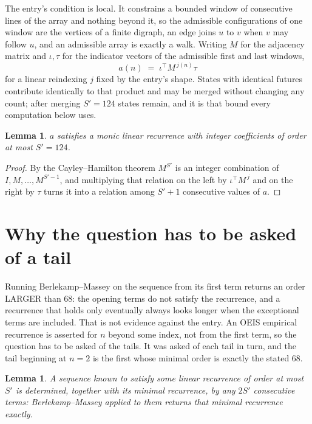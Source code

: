 \documentclass[11pt,a4paper]{article}
\theoremstyle{plain}
\newtheorem{lemma}[theorem]{Lemma}
\theoremstyle{definition}
\begin{document}
The entry's condition is local. It constrains a bounded window of consecutive lines of the
array and nothing beyond it, so the admissible configurations of one window are the vertices of
a finite digraph, an edge joins $u$ to $v$ when $v$ may follow $u$, and an admissible array is
exactly a walk. Writing $M$ for the adjacency matrix and $\iota,\tau$ for the indicator vectors
of the admissible first and last windows,
\[
a(n)\;=\;\iota^{\!\top}M^{\,j(n)}\tau
\]
for a linear reindexing $j$ fixed by the entry's shape. States with identical futures
contribute identically to that product and may be merged without changing any count; after
merging $S'=124$ states remain, and it is that bound every computation below uses.

\begin{lemma}\label{lem:cf}
$a$ satisfies a monic linear recurrence with integer coefficients of order at most $S'=124$.
\end{lemma}

\begin{proof}
By the Cayley--Hamilton theorem $M^{S'}$ is an integer combination of $I,M,\dots,M^{S'-1}$,
and multiplying that relation on the left by $\iota^{\!\top}M^{\,j}$ and on the right by
$\tau$ turns it into a relation among $S'+1$ consecutive values of $a$.
\end{proof}

\section{Why the question has to be asked of a tail}

Running Berlekamp--Massey on the sequence from its first term returns an order LARGER than $68$: the opening terms do not satisfy the recurrence, and a recurrence that holds only eventually always looks longer when the exceptional terms are included. That is not evidence against the entry. An OEIS empirical recurrence is asserted for $n$ beyond some index, not from the first term, so the question has to be asked of the tails. It was asked of each tail in turn, and the tail beginning at $n=2$ is the first whose minimal order is exactly the stated $68$.

\begin{lemma}\label{lem:bm}
A sequence known to satisfy some linear recurrence of order at most $S'$ is determined,
together with its minimal recurrence, by any $2S'$ consecutive terms: Berlekamp--Massey applied
to them returns that minimal recurrence exactly.
\end{lemma}
\end{document}
